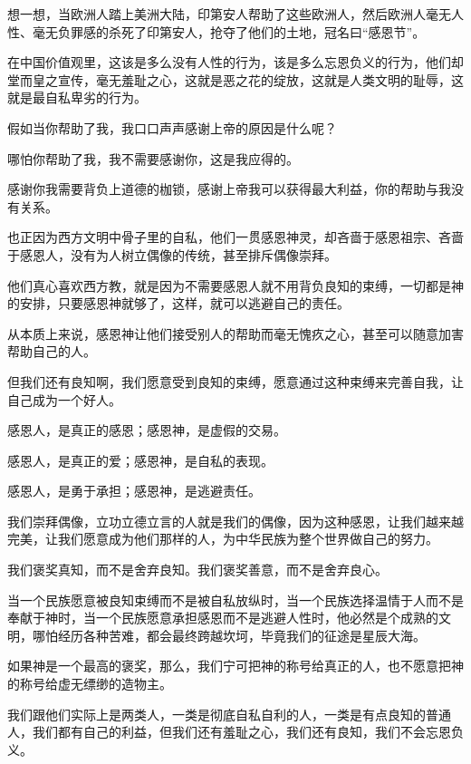 \documentclass[UTF8, 11pt, oneside]{ctexart}
\newcommand{\jg}{\vspace{2em}} %
\begin{document}
\jg

想一想，当欧洲人踏上美洲大陆，印第安人帮助了这些欧洲人，然后欧洲人毫无人性、毫无负罪感的杀死了印第安人，抢夺了他们的土地，冠名曰“感恩节”。

在中国价值观里，这该是多么没有人性的行为，该是多么忘恩负义的行为，他们却堂而皇之宣传，毫无羞耻之心，这就是恶之花的绽放，这就是人类文明的耻辱，这就是最自私卑劣的行为。

\jg

假如当你帮助了我，我口口声声感谢上帝的原因是什么呢？

哪怕你帮助了我，我不需要感谢你，这是我应得的。

感谢你我需要背负上道德的枷锁，感谢上帝我可以获得最大利益，你的帮助与我没有关系。

\jg

也正因为西方文明中骨子里的自私，他们一贯感恩神灵，却吝啬于感恩祖宗、吝啬于感恩人，没有为人树立偶像的传统，甚至排斥偶像崇拜。

他们真心喜欢西方教，就是因为不需要感恩人就不用背负良知的束缚，一切都是神的安排，只要感恩神就够了，这样，就可以逃避自己的责任。

\jg

从本质上来说，感恩神让他们接受别人的帮助而毫无愧疚之心，甚至可以随意加害帮助自己的人。

但我们还有良知啊，我们愿意受到良知的束缚，愿意通过这种束缚来完善自我，让自己成为一个好人。

\jg

感恩人，是真正的感恩；感恩神，是虚假的交易。

感恩人，是真正的爱；感恩神，是自私的表现。

感恩人，是勇于承担；感恩神，是逃避责任。

\jg

我们崇拜偶像，立功立德立言的人就是我们的偶像，因为这种感恩，让我们越来越完美，让我们愿意成为他们那样的人，为中华民族为整个世界做自己的努力。

我们褒奖真知，而不是舍弃良知。我们褒奖善意，而不是舍弃良心。

\jg

当一个民族愿意被良知束缚而不是被自私放纵时，当一个民族选择温情于人而不是奉献于神时，当一个民族愿意承担感恩而不是逃避人性时，他必然是个成熟的文明，哪怕经历各种苦难，都会最终跨越坎坷，毕竟我们的征途是星辰大海。

如果神是一个最高的褒奖，那么，我们宁可把神的称号给真正的人，也不愿意把神的称号给虚无缥缈的造物主。

\jg

我们跟他们实际上是两类人，一类是彻底自私自利的人，一类是有点良知的普通人，我们都有自己的利益，但我们还有羞耻之心，我们还有良知，我们不会忘恩负义。
\end{document}
